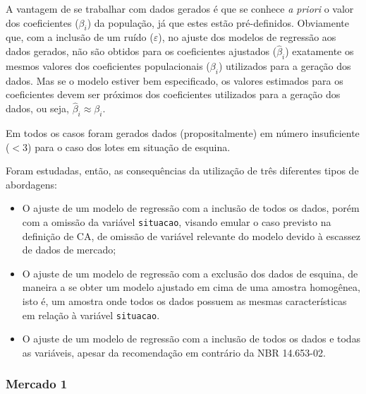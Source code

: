 \documentclass[
  a4paper, 11pt]{article}
\begin{document}
A vantagem de se trabalhar com dados gerados é que se conhece \emph{a
priori} o valor dos coeficientes (\(\beta_i\)) da população, já que
estes estão pré-definidos. Obviamente que, com a inclusão de um ruído
(\(\varepsilon\)), no ajuste dos modelos de regressão aos dados gerados,
não são obtidos para os coeficientes ajustados (\(\hat \beta_i\))
exatamente os mesmos valores dos coeficientes populacionais
(\(\beta_i\)) utilizados para a geração dos dados. Mas se o modelo
estiver bem especificado, os valores estimados para os coeficientes
devem ser próximos dos coeficientes utilizados para a geração dos dados,
ou seja, \(\hat \beta_i \approx \beta_i\).

Em todos os casos foram gerados dados (propositalmente) em número
insuficiente (\(<3\)) para o caso dos lotes em situação de esquina.

Foram estudadas, então, as consequências da utilização de três
diferentes tipos de abordagens:

\begin{itemize}
\item
  O ajuste de um modelo de regressão com a inclusão de todos os dados,
  porém com a omissão da variável \texttt{situacao}, visando emular o
  caso previsto na definição de CA, de omissão de variável relevante do
  modelo devido à escassez de dados de mercado;
\item
  O ajuste de um modelo de regressão com a exclusão dos dados de
  esquina, de maneira a se obter um modelo ajustado em cima de uma
  amostra homogênea, isto é, um amostra onde todos os dados possuem as
  mesmas características em relação à variável \texttt{situacao}.
\item
  O ajuste de um modelo de regressão com a inclusão de todos os dados e
  todas as variáveis, apesar da recomendação em contrário da NBR
  14.653-02.
\end{itemize}

\hypertarget{mercado-1}{%
\subsubsection{Mercado 1}\label{mercado-1}}
\end{document}
